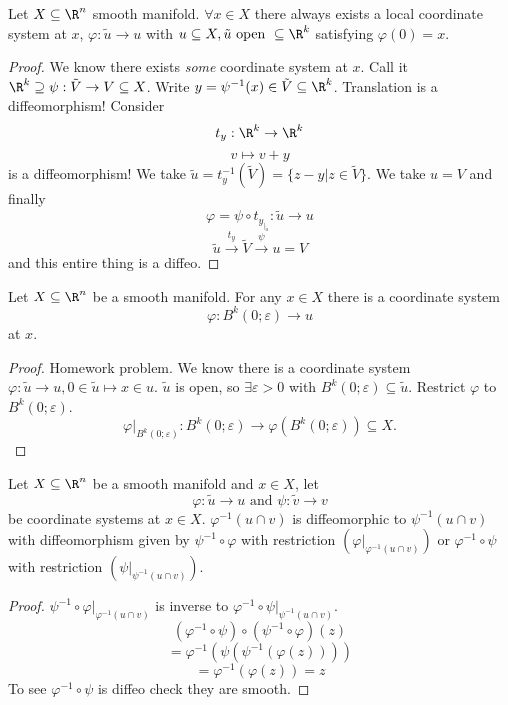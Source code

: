 \begin{lemma}
  Let $X \subseteq \R^n $ smooth manifold. $\forall x\in X$ there always exists a local coordinate system at $x$,
    \newline $\varphi:\tilde{u}\to u$ with $u\subseteq X, \tilde{u} \text{ open }\subseteq \R^k$ satisfying $\varphi (0)=x$.
\end{lemma}
\begin{proof}
  We know there exists \emph{some} coordinate system at $x$. Call it $\R^k\supseteq\psi: \tilde{V}\to V\subseteq X$.
  \newline Write $y=\psi^{-1}(x)\in \tilde{V}\subseteq \R^k$. Translation is a diffeomorphism!
  \newline Consider
    $$t_y: \R^k\to \R^k$$
    $$v\mapsto v+y$$
    is a diffeomorphism!
    \newline
    We take $\tilde{u}=t^{-1}_y(\tilde{V})=\{z-y | z\in \tilde{V}\}$.
    \newline
    We take $u=V$ and finally
      $$\varphi = \psi\circ t_{y_{\rvert_{\tilde{u}}}}: \tilde{u}\to u$$
      $$\tilde{u}\xrightarrow{t_y}\tilde{V}\xrightarrow{\psi}u=V$$
      and this entire thing is a diffeo.
\end{proof}

\begin{lemma}
  Let $X \subseteq \R^n $ be a smooth manifold. For any $x\in X$ there is a coordinate system
    $$\varphi : B^k(0;\varepsilon) \to u$$
  at $x$.
\end{lemma}
\begin{proof}
  Homework problem.
  \newline We know there is a coordinate system $\varphi :\tilde{u}\to u, 0\in \tilde{u} \mapsto x\in u$.
  \newline $\tilde{u}$ is open, so $\exists \varepsilon >0$ with $B^k(0;\varepsilon)\subseteq \tilde{u}$. Restrict $\varphi $ to $B^k(0;\varepsilon)$.
    $$\varphi\rvert_{B^k(0;\varepsilon)}: B^k(0;\varepsilon) \to \varphi \left(B^k(0;\varepsilon)\right)\subseteq X.$$
\end{proof}

\begin{lemma}
  Let $X \subseteq \R^n $ be a smooth manifold and $x\in X$, let
    $$\varphi :\tilde{u}\to u \text{ and }\psi:\tilde{v}\to v$$
  be coordinate systems at $x\in X$.
    \newline $\varphi ^{-1}\left(u\cap v\right)$ is diffeomorphic to $\psi^{-1}\left(u\cap v\right)$ with diffeomorphism given by $\psi^{-1}\circ \varphi $ with restriction $\left(\varphi\rvert_{\varphi^{-1}(u\cap v)}\right)$
     or $\varphi ^{-1}\circ \psi$ with restriction $\left(\psi\rvert_{\psi^{-1}(u\cap v)}\right)$.
  \end{lemma}
  \begin{proof}
      $\psi^{-1}\circ\varphi\rvert_{\varphi^{-1}(u\cap v)}$ is inverse to $\varphi^{-1}\circ \psi\rvert_{\psi^{-1}(u\cap v)}$.
      $$\left(\varphi^{-1}\circ \psi\right)\circ \left(\psi^{-1}\circ \varphi\right)(z)$$
      $$=\varphi^{-1}\left(\psi \left(\psi^{-1} \left(\varphi(z)\right)\right)\right)$$
      $$=\varphi^{-1}\left( \varphi (z)\right)=z$$
    To see $\varphi ^{-1}\circ \psi$ is diffeo check they are smooth.
  \end{proof}

